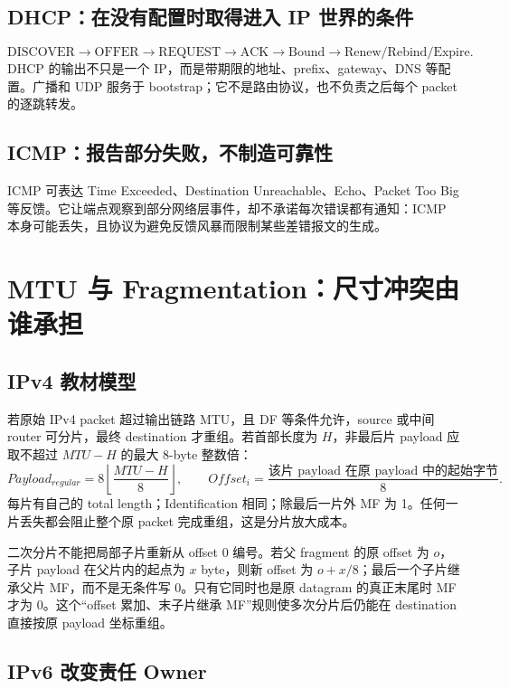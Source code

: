 \documentclass[11pt,a4paper]{ctexart}
\begin{document}
\subsection{DHCP：在没有配置时取得进入 IP 世界的条件}

\[
\text{DISCOVER}\to\text{OFFER}\to\text{REQUEST}\to\text{ACK}
\to\text{Bound}\to\text{Renew/Rebind/Expire}.
\]
DHCP 的输出不只是一个 IP，而是带期限的地址、prefix、gateway、DNS 等配置。广播和 UDP 服务于 bootstrap；它不是路由协议，也不负责之后每个 packet 的逐跳转发。

\subsection{ICMP：报告部分失败，不制造可靠性}

ICMP 可表达 Time Exceeded、Destination Unreachable、Echo、Packet Too Big 等反馈。它让端点观察到部分网络层事件，却不承诺每次错误都有通知：ICMP 本身可能丢失，且协议为避免反馈风暴而限制某些差错报文的生成。

\section{MTU 与 Fragmentation：尺寸冲突由谁承担}

\subsection{IPv4 教材模型}

若原始 IPv4 packet 超过输出链路 MTU，且 DF 等条件允许，source 或中间 router 可分片，最终 destination 才重组。若首部长度为 $H$，非最后片 payload 应取不超过 $MTU-H$ 的最大 8-byte 整数倍：
\[
Payload_{regular}=8\left\lfloor\frac{MTU-H}{8}\right\rfloor,
\qquad
Offset_i=\frac{\text{该片 payload 在原 payload 中的起始字节}}{8}.
\]
每片有自己的 total length；Identification 相同；除最后一片外 MF 为 1。任何一片丢失都会阻止整个原 packet 完成重组，这是分片放大成本。

二次分片不能把局部子片重新从 offset 0 编号。若父 fragment 的原 offset 为 $o$，子片 payload 在父片内的起点为 $x$ byte，则新 offset 为 $o+x/8$；最后一个子片继承父片 MF，而不是无条件写 0。只有它同时也是原 datagram 的真正末尾时 MF 才为 0。这个“offset 累加、末子片继承 MF”规则使多次分片后仍能在 destination 直接按原 payload 坐标重组。

\subsection{IPv6 改变责任 Owner}
\end{document}
